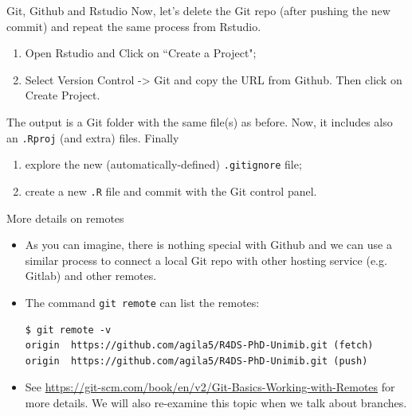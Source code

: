 \documentclass[
hyperref={bookmarks=false},
xcolor={dvipsnames,svgnames*,x11names*}, 
12pt
]{beamer}
\begin{document}
\begin{frame}{Git, Github and Rstudio}
\vspace{-0.5cm}
Now, let's delete the Git repo (after pushing the new commit) and repeat the same process from Rstudio. 
\begin{enumerate}
\itemsep 2ex
\item Open Rstudio and Click on ``Create a Project"; 
\item Select Version Control -> Git and copy the URL from Github. Then click on Create Project. 
\end{enumerate}
The output is a Git folder with the same file(s) as before. Now, it includes also an \texttt{.Rproj} (and extra) files. Finally 
\begin{enumerate}
\item explore the new (automatically-defined) \texttt{.gitignore} file;
\item create a new \texttt{.R} file and commit with the Git control panel.
\end{enumerate}
\end{frame}

\begin{frame}[fragile]{More details on remotes}
\vspace{-0.5cm}
\begin{itemize}
\itemsep 2ex
\item As you can imagine, there is nothing special with Github and we can use a similar process to connect a local Git repo with other hosting service (e.g. Gitlab) and other remotes.  
\item The command \texttt{git remote} can list the remotes: 
\begin{lstlisting}
$ git remote -v
origin  https://github.com/agila5/R4DS-PhD-Unimib.git (fetch)
origin  https://github.com/agila5/R4DS-PhD-Unimib.git (push)
\end{lstlisting}
\item See \url{https://git-scm.com/book/en/v2/Git-Basics-Working-with-Remotes} for more details. We will also re-examine this topic when we talk about branches. 
\end{itemize}
\end{frame}

\end{document}
